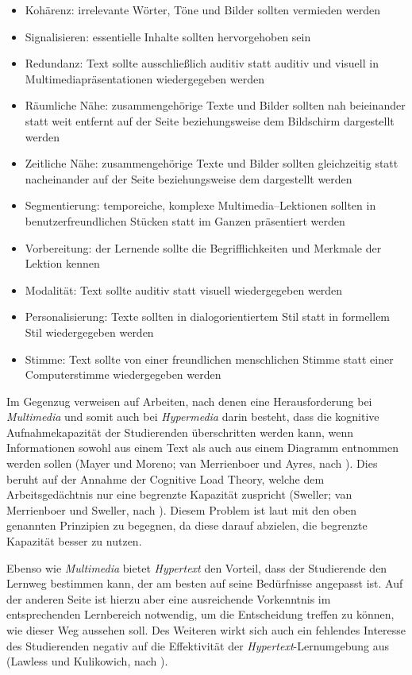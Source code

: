 \begin{itemize}
 \item  Kohärenz: irrelevante Wörter, Töne und Bilder sollten vermieden werden
 \item	Signalisieren: essentielle Inhalte sollten hervorgehoben sein
 \item	Redundanz: Text sollte ausschließlich auditiv statt auditiv und visuell in Multimediapräsentationen wiedergegeben werden
 \item	Räumliche Nähe: zusammengehörige Texte und Bilder sollten nah beieinander statt weit entfernt auf der Seite beziehungsweise dem Bildschirm dargestellt werden
 \item	Zeitliche Nähe: zusammengehörige Texte und Bilder sollten gleichzeitig statt nacheinander auf der Seite beziehungsweise dem dargestellt werden
 \item	Segmentierung: temporeiche, komplexe Multimedia–Lektionen sollten in benutzerfreundlichen Stücken statt im Ganzen präsentiert werden
 \item	Vorbereitung: der Lernende sollte die Begrifflichkeiten und Merkmale der Lektion kennen
 \item	Modalität: Text sollte auditiv statt visuell wiedergegeben werden
 \item	Personalisierung: Texte sollten in dialogorientiertem Stil statt in formellem Stil wiedergegeben werden
 \item	Stimme: Text sollte von einer freundlichen menschlichen Stimme statt einer Computerstimme wiedergegeben werden
\end{itemize}

Im Gegenzug verweisen \cite{moos2010multimedia} auf Arbeiten, nach denen eine Herausforderung bei \textit{Multimedia} und somit auch bei \textit{Hypermedia} darin besteht, dass die kognitive Aufnahmekapazität der Studierenden überschritten werden kann, wenn Informationen sowohl aus einem Text als auch aus einem Diagramm entnommen werden sollen (Mayer und Moreno; van Merrienboer und Ayres, nach \cite{moos2010multimedia}). Dies beruht auf der Annahme der Cognitive Load Theory, welche dem Arbeitsgedächtnis nur eine begrenzte Kapazität zuspricht (Sweller; van Merrienboer und Sweller, nach \cite{moos2010multimedia}). Diesem Problem ist laut \cite{mayer2009multimedia} mit den oben genannten Prinzipien zu begegnen, da diese darauf abzielen, die begrenzte Kapazität besser zu nutzen.

Ebenso wie \textit{Multimedia} bietet \textit{Hypertext} den Vorteil, dass der Studierende den Lernweg bestimmen kann, der am besten auf seine Bedürfnisse angepasst ist. Auf der anderen Seite ist hierzu aber eine ausreichende Vorkenntnis im entsprechenden Lernbereich notwendig, um die Entscheidung treffen zu können, wie dieser Weg aussehen soll. Des Weiteren wirkt sich auch ein fehlendes Interesse des Studierenden negativ auf die Effektivität der \textit{Hypertext}-Lernumgebung aus (Lawless und Kulikowich, nach \cite{moos2010multimedia}).


